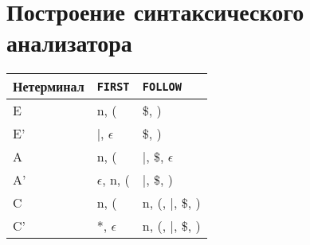 \documentclass[paper=a4, fontsize=11pt]{scrartcl} %
\numberwithin{equation}{section} %
\numberwithin{figure}{section} %
\numberwithin{table}{section} %
\begin{document}
\section{Построение синтаксического анализатора}
\begin{tabular}{|l | l | l|}
\hline
Нетерминал & \texttt{FIRST} & \texttt{FOLLOW} \\ \hline
E & n, ( & \$, ) \\ \hline
E' & |, $\epsilon$ & \$, ) \\ \hline
A & n, ( & |, \$, $\epsilon$ \\ \hline
A' & $\epsilon$, n, (&|, \$, ) \\ \hline
C & n, ( & n, (, |, \$, )\\ \hline
C' & *, $\epsilon$ & n, (, |, \$, )\\ \hline
\end{tabular}
\end{document}
